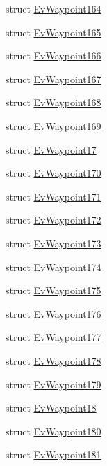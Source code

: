 \begin{DoxyCompactItemize}
\item 
struct \hyperlink{structmove__base__z__client_1_1EvWaypoint164}{Ev\+Waypoint164}
\item 
struct \hyperlink{structmove__base__z__client_1_1EvWaypoint165}{Ev\+Waypoint165}
\item 
struct \hyperlink{structmove__base__z__client_1_1EvWaypoint166}{Ev\+Waypoint166}
\item 
struct \hyperlink{structmove__base__z__client_1_1EvWaypoint167}{Ev\+Waypoint167}
\item 
struct \hyperlink{structmove__base__z__client_1_1EvWaypoint168}{Ev\+Waypoint168}
\item 
struct \hyperlink{structmove__base__z__client_1_1EvWaypoint169}{Ev\+Waypoint169}
\item 
struct \hyperlink{structmove__base__z__client_1_1EvWaypoint17}{Ev\+Waypoint17}
\item 
struct \hyperlink{structmove__base__z__client_1_1EvWaypoint170}{Ev\+Waypoint170}
\item 
struct \hyperlink{structmove__base__z__client_1_1EvWaypoint171}{Ev\+Waypoint171}
\item 
struct \hyperlink{structmove__base__z__client_1_1EvWaypoint172}{Ev\+Waypoint172}
\item 
struct \hyperlink{structmove__base__z__client_1_1EvWaypoint173}{Ev\+Waypoint173}
\item 
struct \hyperlink{structmove__base__z__client_1_1EvWaypoint174}{Ev\+Waypoint174}
\item 
struct \hyperlink{structmove__base__z__client_1_1EvWaypoint175}{Ev\+Waypoint175}
\item 
struct \hyperlink{structmove__base__z__client_1_1EvWaypoint176}{Ev\+Waypoint176}
\item 
struct \hyperlink{structmove__base__z__client_1_1EvWaypoint177}{Ev\+Waypoint177}
\item 
struct \hyperlink{structmove__base__z__client_1_1EvWaypoint178}{Ev\+Waypoint178}
\item 
struct \hyperlink{structmove__base__z__client_1_1EvWaypoint179}{Ev\+Waypoint179}
\item 
struct \hyperlink{structmove__base__z__client_1_1EvWaypoint18}{Ev\+Waypoint18}
\item 
struct \hyperlink{structmove__base__z__client_1_1EvWaypoint180}{Ev\+Waypoint180}
\item 
struct \hyperlink{structmove__base__z__client_1_1EvWaypoint181}{Ev\+Waypoint181}
\item 

\end{DoxyCompactItemize}
